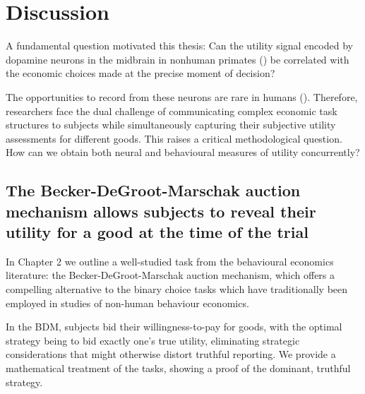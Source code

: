 \chapter{Discussion}

\ifpdf
    \graphicspath{{Chapter4/Figs/Raster/}{Chapter5/Figs/PDF/}{Chapter5/Figs/}}
\else
    \graphicspath{{Chapter5/Figs/Vector/}{Chapter5/Figs/}}
\fi

A fundamental question motivated this thesis: Can the utility signal encoded by dopamine neurons in the midbrain in nonhuman primates (\cite{staufferDopamineRewardPrediction2014}) be correlated with the economic choices made at the precise moment of decision? 

The opportunities to record from these neurons are rare in humans (\cite{zaghloulHumanSubstantiaNigra2009}). Therefore, researchers face the dual challenge of communicating complex economic task structures to subjects while simultaneously capturing their subjective utility assessments for different goods. This raises a critical methodological question. How can we obtain both neural and behavioural measures of utility concurrently?

\clearpage
\section{The Becker-DeGroot-Marschak auction mechanism allows subjects to reveal their utility for a good at the time of the trial}

In Chapter 2 we outline a well-studied task from the behavioural economics literature: the Becker-DeGroot-Marschak auction mechanism, which offers a compelling alternative to the binary choice tasks which have traditionally been employed in studies of non-human behaviour economics.

In the BDM, subjects bid their willingness-to-pay for goods, with the optimal strategy being to bid exactly one's true utility, eliminating strategic considerations that might otherwise distort truthful reporting. We provide a mathematical treatment of the tasks, showing a proof of the dominant, truthful strategy.

